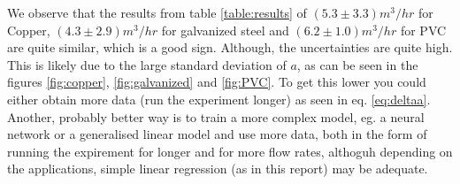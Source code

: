 We observe that the results from table \ref{table:results} of  $(5.3\pm 3.3)m^3/hr$ for Copper, $(4.3\pm 2.9)m^3/hr$ for galvanized steel and $(6.2\pm 1.0)m^3/hr$ for PVC are quite similar, which is a good sign. Although, the uncertainties are quite high. This is likely due to the large standard deviation of $a$, as can be seen in the figures \ref{fig:copper}, \ref{fig:galvanized} and \ref{fig:PVC}. To get this lower you could either obtain more data (run the experiment longer) as seen in eq. \ref{eq:deltaa}. Another, probably better way is to train a more complex model, eg. a neural network or a generalised linear model and use more data, both in the form of running the expirement for longer and for more flow rates, althoguh depending on the applications, simple linear regression (as in this report) may be adequate.